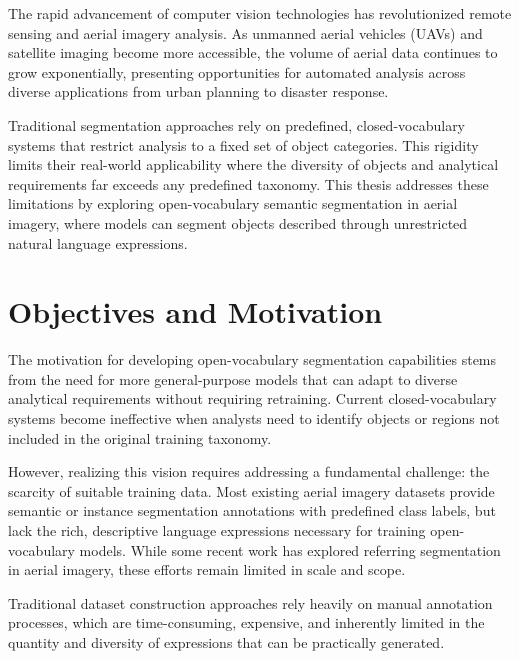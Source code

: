 \cleardoublepage
\label{chap:intro}
The rapid advancement of computer vision technologies has revolutionized remote sensing and aerial imagery analysis. As unmanned aerial vehicles (UAVs) and satellite imaging become more accessible, the volume of aerial data continues to grow exponentially, presenting opportunities for automated analysis across diverse applications from urban planning to disaster response.

Traditional segmentation approaches rely on predefined, closed-vocabulary systems that restrict analysis to a fixed set of object categories. This rigidity limits their real-world applicability where the diversity of objects and analytical requirements far exceeds any predefined taxonomy. This thesis addresses these limitations by exploring open-vocabulary semantic segmentation in aerial imagery, where models can segment objects described through unrestricted natural language expressions.

\section{Objectives and Motivation}

The motivation for developing open-vocabulary segmentation capabilities stems from the need for more general-purpose models that can adapt to diverse analytical requirements without requiring retraining. Current closed-vocabulary systems become ineffective when analysts need to identify objects or regions not included in the original training taxonomy.

However, realizing this vision requires addressing a fundamental challenge: the scarcity of suitable training data. Most existing aerial imagery datasets provide semantic or instance segmentation annotations with predefined class labels, but lack the rich, descriptive language expressions necessary for training open-vocabulary models. While some recent work has explored referring segmentation in aerial imagery, these efforts remain limited in scale and scope.

Traditional dataset construction approaches rely heavily on manual annotation processes, which are time-consuming, expensive, and inherently limited in the quantity and diversity of expressions that can be practically generated.

